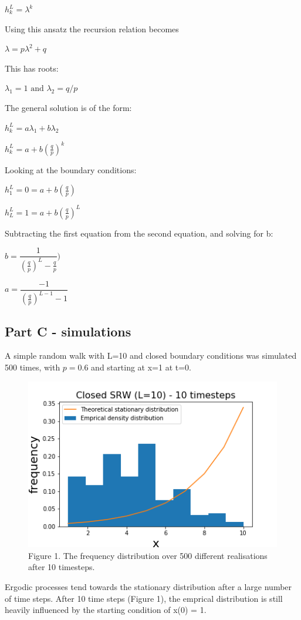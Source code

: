 \documentclass{article}
\begin{document}
$h_{k}^L = \lambda^k $

Using this ansatz the recursion relation becomes

$\lambda = p \lambda^2 + q$

This has roots:

$\lambda_1 = 1 \text{ and } \lambda_2 = q/p$



The general solution is of the form:

$h_k^L = a\lambda_1 + b\lambda_2$ 

$h_k^L = a + b(\frac{q}{p})^k$ 


Looking at the boundary conditions:

$h_1^L = 0 = a + b(\frac{q}{p})$

$h_L^L = 1 = a + b(\frac{q}{p})^L$

Subtracting the first equation from the second equation, and solving for b:

$b = \dfrac{1}{(\frac{q}{p})^{L}-\frac{q}{p}})$

$a = \dfrac{-1}{(\frac{q}{p})^{L-1}-1}$


\subsection{Part C - simulations}

A simple random walk with L=10 and closed boundary conditions was simulated 500 times, with $p=0.6$ and starting at x=1 at t=0.

\begin{figure}[H]
\includegraphics[scale=0.8]{10_steps_a.png} 
\small{Figure 1. The frequency distribution over 500 different realisations after 10 timesteps.}
\end{figure}

Ergodic processes tend towards the stationary distribution after a large number of time steps. After 10 time steps (Figure 1), the emprical distribution is still heavily influenced by the starting condition of x(0) = 1. 
\end{document}
